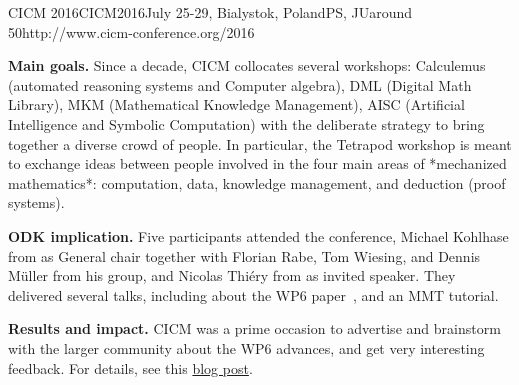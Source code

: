 \begin{event}{CICM 2016}{CICM2016}{July 25-29, Bialystok, Poland}{PS, JU}{around 50}{http://www.cicm-conference.org/2016}

\textbf{Main goals.} Since a decade, CICM collocates several workshops: Calculemus
(automated reasoning systems and Computer algebra), DML (Digital Math
Library), MKM (Mathematical Knowledge Management), AISC (Artificial
Intelligence and Symbolic Computation) with the deliberate strategy to
bring together a diverse crowd of people. In particular, the Tetrapod
workshop is meant to exchange ideas between people involved in the
four main areas of *mechanized mathematics*: computation, data,
knowledge management, and deduction (proof systems).

\textbf{ODK implication.} Five \ODK participants attended the
conference, Michael Kohlhase from  as General chair together
with Florian Rabe, Tom Wiesing, and Dennis Müller from his group, and
Nicolas Thiéry from  as invited speaker. They delivered
several talks, including about the WP6 paper~\cite{DehKohKon:iop16},
and an MMT tutorial.

\textbf{Results and impact.} CICM was a prime occasion to advertise
and brainstorm with the larger community about the WP6 advances, and
get very interesting feedback. For details, see this
\href{http://opendreamkit.org/activities/2016-08-01-CICM/}{blog post}.
\end{event}
